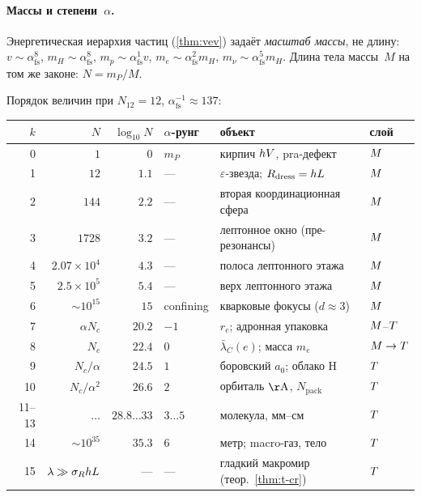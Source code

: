 \paragraph{Массы и степени~$\alpha$.}
Энергетическая иерархия частиц (\cref{thm:vev}) задаёт \emph{масштаб массы}, не длину:
$v\sim\alpha_{\mathrm{fs}}^{8}$, $m_H\sim\alpha_{\mathrm{fs}}^{8}$,
$m_p\sim\alpha_{\mathrm{fs}}^{1}v$, $m_e\sim\alpha_{\mathrm{fs}}^{2}m_H$,
$m_\nu\sim\alpha_{\mathrm{fs}}^{5}m_H$.
Длина тела массы~$M$ на том же законе: $N=m_P/M$.

\begin{proposition}
\label{prop:ladder-rungs}
Порядок величин при $N_{12}=12$, $\alpha_{\mathrm{fs}}^{-1}\approx 137$:

\smallskip
\begin{center}
\footnotesize
\setlength{\tabcolsep}{4pt}
\begin{tabular}{@{}r r r l l l@{}}
\toprule
$k$ & $N$ & $\log_{10}N$ & $\alpha$-рунг & объект & слой \\
\midrule
0 & $1$ & $0$ & $m_P$ & кирпич $hV$, pra-дефект & $M$ \\
1 & $12$ & $1.1$ & --- & $\varepsilon$-звезда; $R_{\mathrm{dress}}=hL$ & $M$ \\
2 & $144$ & $2.2$ & --- & вторая координационная сфера & $M$ \\
3 & $1728$ & $3.2$ & --- & лептонное окно (пре-резонансы) & $M$ \\
4 & $2.07\times 10^4$ & $4.3$ & --- & полоса лептонного этажа & $M$ \\
5 & $2.5\times 10^5$ & $5.4$ & --- & верх лептонного этажа & $M$ \\
6 & $\sim 10^{15}$ & $15$ & confining & кварковые фокусы ($d\approx 3$) & $M$ \\
7 & $\alpha N_c$ & $20.2$ & $-1$ & $r_e$; адронная упаковка & $M$--$T$ \\
8 & $N_c$ & $22.4$ & $0$ & $\bar\lambda_C(e)$; масса $m_e$ & $M\to T$ \\
9 & $N_c/\alpha$ & $24.5$ & $1$ & боровский $a_0$; облако H & $T$ \\
10 & $N_c/\alpha^2$ & $26.6$ & $2$ & орбиталь $\mathrm{\AA}$, $N_{\mathrm{pack}}$ & $T$ \\
11--13 & $\ldots$ & $28.8\ldots 33$ & $3\ldots 5$ & молекула, мм--см & $T$ \\
14 & $\sim 10^{35}$ & $35.3$ & $6$ & метр; macro-газ, тело & $T$ \\
15 & $\lambda\gg\sigma_RhL$ & --- & --- & гладкий макромир (теор.~\ref{thm:t-cr}) & $T$ \\
\bottomrule
\end{tabular}
\end{center}
\end{proposition}


